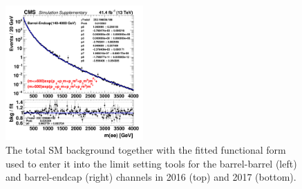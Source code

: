 \begin{figure}
\begin{center}
    \includegraphics[width=0.47\textwidth]{figures/Zprime/2017/bgkfit/BE__bgk.png}
    \caption{The total SM background together with the fitted functional form used to enter it into the limit setting tools for the barrel-barrel (left) and barrel-endcap (right) channels in 2016 (top) and 2017 (bottom).}
    \label{fig:bkgFits}
  \end{center}
\end{figure}

